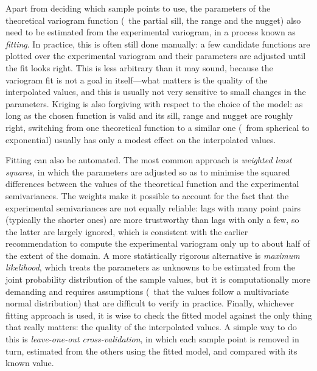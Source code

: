 Apart from deciding which sample points to use, the parameters of the theoretical variogram function (\ie\ the partial sill, the range and the nugget) also need to be estimated from the experimental variogram, in a process known as \emph{fitting}.
In practice, this is often still done manually: a few candidate functions are plotted over the experimental variogram and their parameters are adjusted until the fit looks right.
This is less arbitrary than it may sound, because the variogram fit is not a goal in itself---what matters is the quality of the interpolated values, and this is usually not very sensitive to small changes in the parameters.
Kriging is also forgiving with respect to the choice of the model: as long as the chosen function is valid and its sill, range and nugget are roughly right, switching from one theoretical function to a similar one (\eg\ from spherical to exponential) usually has only a modest effect on the interpolated values.

Fitting can also be automated.
The most common approach is \emph{weighted least squares}, in which the parameters are adjusted so as to minimise the squared differences between the values of the theoretical function and the experimental semivariances.
The weights make it possible to account for the fact that the experimental semivariances are not equally reliable: lags with many point pairs (typically the shorter ones) are more trustworthy than lags with only a few, so the latter are largely ignored, which is consistent with the earlier recommendation to compute the experimental variogram only up to about half of the extent of the domain.
A more statistically rigorous alternative is \emph{maximum likelihood}, which treats the parameters as unknowns to be estimated from the joint probability distribution of the sample values, but it is computationally more demanding and requires assumptions (\eg\ that the values follow a multivariate normal distribution) that are difficult to verify in practice.
Finally, whichever fitting approach is used, it is wise to check the fitted model against the only thing that really matters: the quality of the interpolated values.
A simple way to do this is \emph{leave-one-out cross-validation}, in which each sample point is removed in turn, estimated from the others using the fitted model, and compared with its known value.

